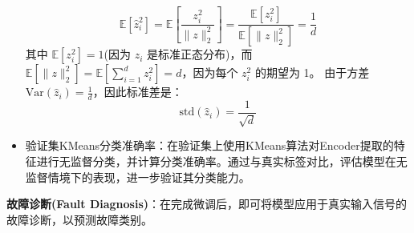 \documentclass[master]{thesis-uestc}
\begin{document}
\begin{itemize}
        \begin{equation}
        \mathbb{E}[\hat{z}_i^2] = \mathbb{E}\left[\frac{z_i^2}{\|z\|_2^2}\right] = \frac{\mathbb{E}[z_i^2]}{\mathbb{E}[\|z\|_2^2]} = \frac{1}{d}
        \end{equation}
        其中 \( \mathbb{E}[z_i^2] = 1 \)(因为 \( z_i \) 是标准正态分布)，而 \( \mathbb{E}[\|z\|_2^2] = \mathbb{E}[\sum_{i=1}^{d} z_i^2] = d \)，因为每个 \( z_i^2 \) 的期望为 1。
        由于方差 \( \text{Var}(\hat{z}_i) = \frac{1}{d} \)，因此标准差是：
        \begin{equation}
        \text{std}(\hat{z}_i) = \frac{1}{\sqrt{d}}
        \end{equation}

        \item 验证集KMeans分类准确率：在验证集上使用KMeans算法对Encoder提取的特征进行无监督分类，并计算分类准确率。通过与真实标签对比，评估模型在无监督情境下的表现，进一步验证其分类能力。
    \end{itemize}     


\textbf{故障诊断(Fault Diagnosis)}：在完成微调后，即可将模型应用于真实输入信号的故障诊断，以预测故障类别。
\FloatBarrier  %
\end{document}
